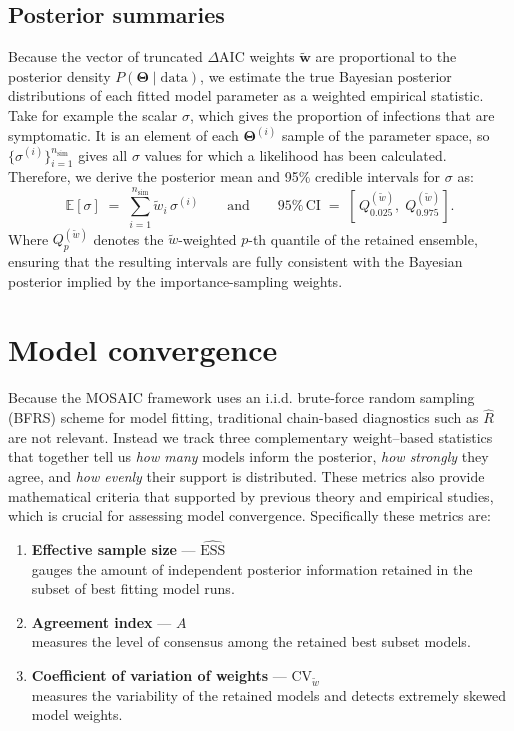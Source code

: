 \documentclass[
]{book}
\providecommand{\tightlist}{%
  \setlength{\itemsep}{0pt}\setlength{\parskip}{0pt}}
\begin{document}
\subsection{Posterior summaries}\label{posterior-summaries}

Because the vector of truncated \(\Delta \text{AIC}\) weights \(\mathbf{\tilde{w}}\) are proportional to the posterior density \(P(\boldsymbol{\Theta}\mid\text{data})\), we estimate the true Bayesian posterior distributions of each fitted model parameter as a weighted empirical statistic. Take for example the scalar \(\sigma\), which gives the proportion of infections that are symptomatic. It is an element of each \(\boldsymbol{\Theta}^{(i)}\) sample of the parameter space, so \(\bigl\{\sigma^{(i)}\bigr\}_{i=1}^{n_{\text{sim}}}\) gives all \(\sigma\) values for which a likelihood has been calculated. Therefore, we derive the posterior mean and 95\% credible intervals for \(\sigma\) as:
\begin{equation}
\mathbb{E}[\sigma] \;=\; \sum_{i=1}^{n_{\text{sim}}} \tilde{w}_i\,\sigma^{(i)}
\qquad \text{and} \qquad
95\% \, \text{CI} \;=\; \left[\,Q^{(\tilde{w})}_{0.025},\; Q^{(\tilde{w})}_{0.975}\right].
\label{eq:weighted-posterior}
\end{equation}
Where \(Q^{(\tilde{w})}_{p}\) denotes the \(\tilde{w}\)-weighted \(p\)-th quantile of the retained ensemble, ensuring that the resulting intervals are
fully consistent with the Bayesian posterior implied by the importance-sampling weights.

\section{Model convergence}\label{model-convergence}

Because the MOSAIC framework uses an i.i.d. brute-force random sampling (BFRS) scheme for model fitting, traditional chain-based diagnostics such as \(\hat R\) are not relevant. Instead we track three complementary weight--based statistics that together tell us \emph{how many} models inform the posterior, \emph{how strongly} they agree, and \emph{how evenly} their support is distributed. These metrics also provide mathematical criteria that supported by previous theory and empirical studies, which is crucial for assessing model convergence. Specifically these metrics are:

\begin{enumerate}
\def\labelenumi{\arabic{enumi}.}
\tightlist
\item
  \textbf{Effective sample size} --- \(\widehat{\text{ESS}}\)\\
  gauges the amount of independent posterior information retained in the subset of best fitting model runs.
\item
  \textbf{Agreement index} --- \(A\)\\
  measures the level of consensus among the retained best subset models.
\item
  \textbf{Coefficient of variation of weights} --- \(\mathrm{CV}_{\tilde w}\)\\
  measures the variability of the retained models and detects extremely skewed model weights.
\end{enumerate}
\end{document}
